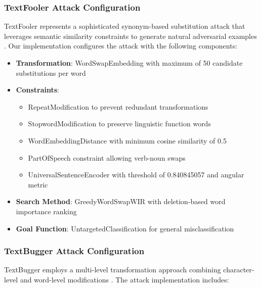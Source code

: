 \documentclass[../main.tex]{subfiles}
\begin{document}
\subsubsection{TextFooler Attack Configuration}

TextFooler represents a sophisticated synonym-based substitution attack that leverages semantic similarity constraints to generate natural adversarial examples \cite{jin2019textfooler}. Our implementation configures the attack with the following components:

\begin{itemize}
\item \textbf{Transformation}: WordSwapEmbedding with maximum of 50 candidate substitutions per word
\item \textbf{Constraints}:
\begin{itemize}
\item RepeatModification to prevent redundant transformations
\item StopwordModification to preserve linguistic function words
\item WordEmbeddingDistance with minimum cosine similarity of 0.5
\item PartOfSpeech constraint allowing verb-noun swaps
\item UniversalSentenceEncoder with threshold of 0.840845057 and angular metric
\end{itemize}
\item \textbf{Search Method}: GreedyWordSwapWIR with deletion-based word importance ranking
\item \textbf{Goal Function}: UntargetedClassification for general misclassification
\end{itemize}

\subsubsection{TextBugger Attack Configuration}

TextBugger employs a multi-level transformation approach combining character-level and word-level modifications \cite{li2018textbugger}. The attack implementation includes:
\end{document}

